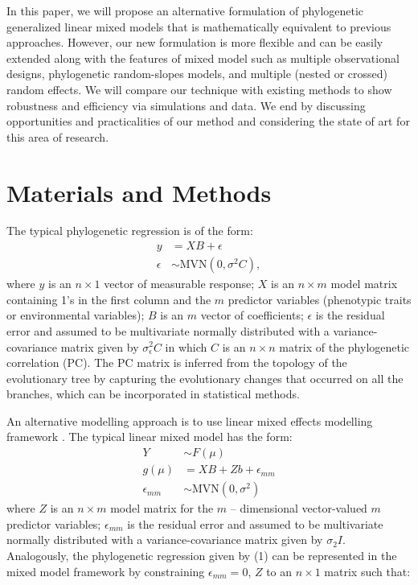 In this paper, we will propose an alternative formulation of phylogenetic generalized linear mixed models that is mathematically equivalent to previous approaches.
However, our new formulation is more flexible and can be easily extended along with the features of mixed model such as multiple observational designs, phylogenetic random-slopes models, and multiple (nested or crossed) random effects.
We will compare our technique with existing methods to show robustness and efficiency via simulations and data.
We end by discussing opportunities and practicalities of our method and considering the state of art for this area of research. 

\section{Materials and Methods}

The typical phylogenetic regression is of the form:
\begin{align}
y & = XB + \epsilon \label{eq:gls1} \\ 
\epsilon & \sim \textrm{MVN}(0,\sigma^{2}C), \label{eq:gls2}
\end{align}
where $y$ is an $n \times 1$ vector of measurable response; $X$ is an $n \times m$ model matrix containing 1's in the first column and the $m$ predictor variables (phenotypic traits or environmental variables); $B$ is an $m$ vector of coefficients; $\epsilon$ is the residual error and assumed to be multivariate normally distributed with a variance-covariance matrix given by $\sigma^{2}_{\epsilon}C$ in which $C$ is an $n \times n$ matrix of the phylogenetic correlation (PC).
The PC matrix is inferred from the topology of the evolutionary tree by capturing the evolutionary changes that occurred on all the branches, which can be incorporated in statistical methods.

An alternative modelling approach is to use linear mixed effects modelling framework \citep{lynch1991methods}.
The typical linear mixed model has the form:
\begin{align}
Y & \sim F(\mu) \label{eq:glmm1} \\
g(\mu) & = XB + Zb + \epsilon_{mm} \label{eq:glmm2} \\
\epsilon_{mm} & \sim \textrm{MVN}(0,\sigma^2) \label{eq:glmm3}
\end{align}
where $Z$ is an $n \times m$ model matrix for the $m$ -- dimensional vector-valued $m$ predictor variables; $\epsilon_{mm}$ is the residual error and assumed to be multivariate normally distributed with a variance-covariance matrix given by $\sigma_{2}I$.
Analogously, the phylogenetic regression given by (1) can be represented in the mixed model framework by constraining $\epsilon_{mm} = 0$, $Z$ to an $n \times 1$ matrix such that: 

